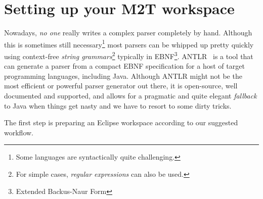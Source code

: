 \newpage
\section{Setting up your M2T workspace}
\genHeader

Nowadays, \emph{no one} really writes a complex parser completely by hand. Although this is sometimes still necessary\footnote{Some languages are syntactically
quite challenging.} most parsers can be whipped up pretty quickly using context-free \emph{string grammars}\footnote{For simple cases, \emph{regular
expressions} can also be used.} typically in EBNF\footnote{Extended Backus-Naur Form}.
ANTLR~\cite{ANTLR} is a tool that can generate a parser from a compact EBNF specification for a host of target programming languages, including Java.
Although ANTLR might not be the most efficient or powerful parser generator out there, it is open-source, well documented and supported, and allows for a
pragmatic and quite elegant \emph{fallback} to Java when things get nasty and we have to resort to some dirty tricks.




The first step is preparing an Eclipse workspace according to our suggested workflow.






